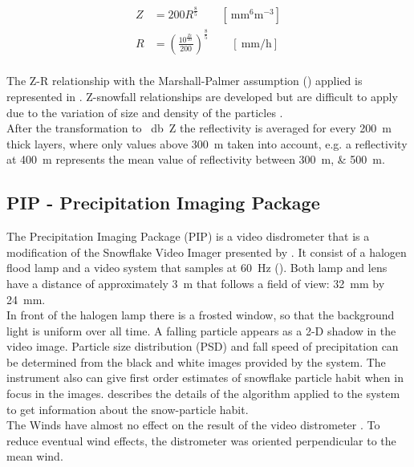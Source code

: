 \begin{align}
	Z & = 200 R^{\frac{8}{5}} \qquad [\SI{}{\mm^6\metre^{-3}} ] \nonumber \\ 
	R & = \left( \frac{ 10^{\frac{Ze}{10}} }{200} \right)^{\frac{8}{5}} \qquad [ \SI{}{\mm\per\hour} ]
	\label{eq:Z-R}
\end{align}
\\
The Z-R relationship with the Marshall-Palmer assumption () applied is represented in . Z-snowfall relationships are developed but are difficult to apply due to the variation of size and density of the particles \citep{lecuyer_aos_2017}. \\
After the transformation to \SI{}{\decibel Z} the reflectivity is averaged for every \SI{200}{\metre} thick layers, where only values above \SI{300}{\metre} taken into account, e.g. a reflectivity at \SI{400}{\metre} represents the mean value of reflectivity between \SIlist{300;500}{\metre}. 


\newpage
\subsection{PIP - Precipitation Imaging Package}

The Precipitation Imaging Package (PIP) is a video disdrometer that is a modification of the Snowflake Video Imager presented by \citet{newman_presenting_2009}. It consist of a halogen flood lamp and a video system that samples at \SI{60}{\Hz} (). 
Both lamp and lens have a distance of approximately \SI{3}{\metre} that follows a field of view: \SI{32}{\mm} by \SI{24}{\mm}. 
\\
In front of the halogen lamp there is a frosted window, so that the background light is uniform over all time. A falling particle appears as a 2-D shadow in the video image. 
Particle size distribution (PSD) and fall speed of precipitation can be determined from the black and white images provided by the system. The instrument also can give first order estimates of snowflake particle habit when in focus in the images.  
\citet{newman_presenting_2009} describes the details of the algorithm applied to the system to get information about the snow-particle habit. \\
The Winds have almost no effect on the result of the video distrometer \citep{newman_presenting_2009}. To reduce eventual wind effects, the distrometer was oriented perpendicular to the mean wind.


